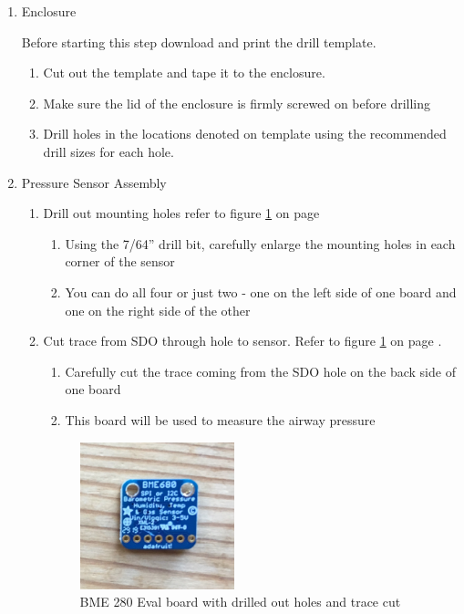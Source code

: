 \documentclass[11pt, letterpaper]{article}
\begin{document}
\begin{enumerate}
\item \label{itm:enclosure}
Enclosure

Before starting this step download and print the drill template. 

\begin{enumerate}[label=2.\arabic*]
\item
Cut out the template and tape it to the enclosure.
\item
Make sure the lid of the enclosure is firmly screwed on before drilling
\item
Drill holes in the locations denoted on template using the recommended drill sizes for each hole. 
\end{enumerate}

\item
Pressure Sensor Assembly
\begin{enumerate}[label=3.\arabic*]
\item
Drill out mounting holes refer to figure \ref{fig:bme_1} on page \pageref{fig:bme_1}
\begin{enumerate}[label=3.1.\arabic*]
\item
Using the 7/64'' drill bit, carefully enlarge the mounting holes in each corner of the sensor
\item
You can do all four or just two - one on the left side of one board and one on the right side of the other
\end{enumerate}
\item
Cut trace from SDO through hole to sensor. Refer to figure \ref{fig:bme_1} on page \pageref{fig:bme_1}.
\begin{enumerate}[label=3.2.\arabic*]
\item
Carefully cut the trace coming from the SDO hole on the back side of one board
\item
This board will be used to measure the airway pressure
\end{enumerate}
\begin{figure}[H]
\centering
\includegraphics[width=0.45\textwidth]{images/bme_1.JPG}
\caption{BME 280 Eval board with drilled out holes and trace cut} 
\label{fig:bme_1}
\end{figure}


\end{enumerate}
\end{enumerate}
\end{document}
